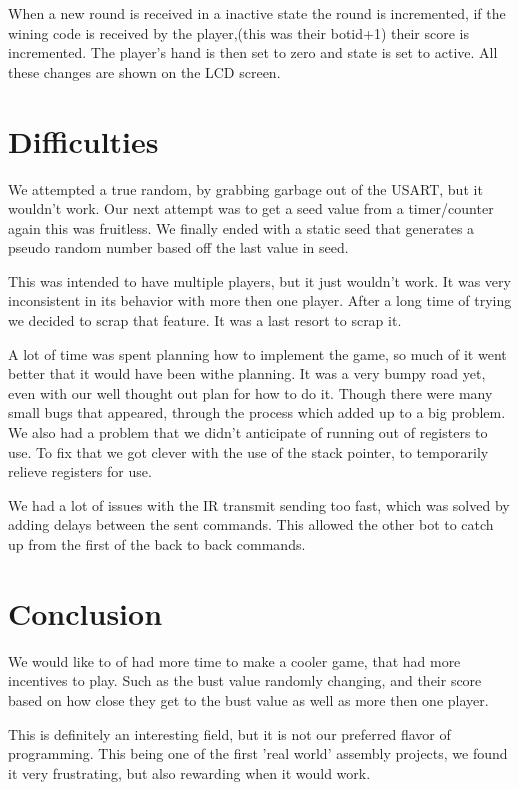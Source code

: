 \documentclass[10pt,letterpaper]{article}
\begin{document}
When a new round is received in a inactive state the round is incremented, if the wining code is received by the player,(this was their botid+1) their score is incremented. The player's hand is then set to zero and state is set to active. All these changes are shown on the LCD screen.

\section{Difficulties}

We attempted a true random, by grabbing garbage out of the USART, but it wouldn't work. Our next attempt was to get a seed value from a timer/counter again this was fruitless. We finally ended with a static seed that generates a pseudo random number based off the last value in seed.

This was intended to have multiple players, but it just wouldn't work. It was very inconsistent in its behavior with more then one player. After a long time of trying we decided to scrap that feature. It was a last resort to scrap it.

A lot of time was spent planning how to implement the game, so much of it went better that it would have been withe planning.
It was a very bumpy road yet, even with our well thought out plan for how to do it.
Though there were many small bugs that appeared, through the process which added up to a big problem.
We also had a problem that we didn't anticipate of running out of registers to use.
To fix that we got clever with the use of the stack pointer, to temporarily relieve registers for use.

We had a lot of issues with the IR transmit sending too fast, which was solved by adding delays between the sent commands. This allowed the other bot to catch up from the first of the back to back commands.

\section{Conclusion}

We would like to of had more time to make a cooler game, that had more incentives to play. Such as the bust value randomly changing, and their score based on how close they get to the bust value as well as more then one player.

This is definitely an interesting field, but it is not our preferred flavor of programming. This being one of the first 'real world' assembly projects, we found it very frustrating, but also rewarding when it would work.
\end{document}
